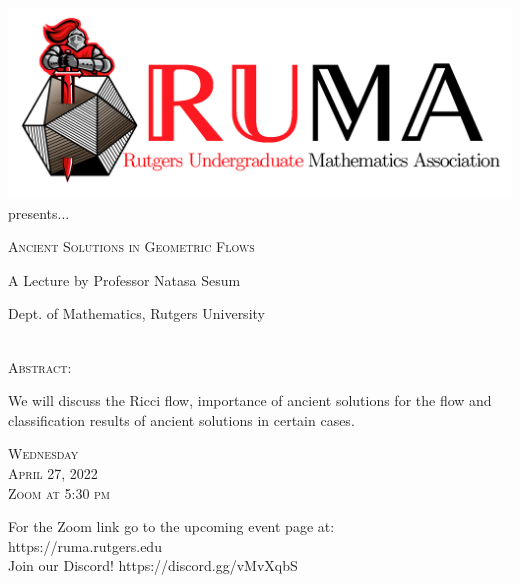 \documentclass[12pt]{article}
\begin{document}

\begin{center}\includegraphics[scale=.45]{RUMAlogo.png}\\
\large  presents... \\

\begin{spacing}{1}
{\fontsize{34}{34}\selectfont  \textsc{Ancient Solutions in Geometric Flows
}} \end{spacing}

\begin{spacing}{1.5}
{\fontsize{23}{23} \selectfont A Lecture by Professor Natasa Sesum}  \end{spacing} 
\large Dept. of Mathematics, Rutgers University \\~~\\

\vspace{10mm} 

\Large
\textsc{Abstract:}

\LARGE 
We will discuss the Ricci flow, importance of ancient solutions for the flow and classification results of ancient solutions in certain cases.

\vspace{25mm} 
\Huge   \textsc{Wednesday\\April 27, 2022
\\Zoom at 5:30 pm}
\end{center}
\begin{center}
\Large  For the Zoom link go to the upcoming event page at:\\
https://ruma.rutgers.edu \\
Join our 
Discord! https://discord.gg/vMvXqbS
\end{center}
\end{document}
